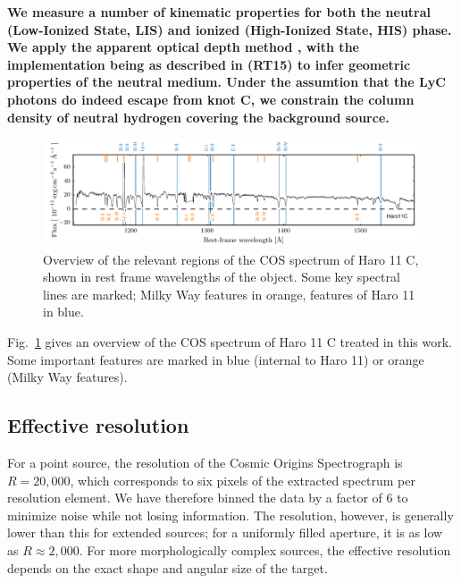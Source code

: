 \documentclass[twocolumn, trackchanges]{aastex61}
\begin{document}
\textbf{We measure a number of kinematic properties for both the neutral 
(Low-Ionized State, LIS) and ionized (High-Ionized State, HIS) phase. We apply 
the apparent optical depth method \citep[AOD, ][]{Savage1991, Pettini2002, Quider2009, Jones2013},
with the implementation being as described in \citet{RiveraThorsen2015} (RT15)
to infer geometric properties of the neutral medium. Under the assumtion that
the LyC photons do indeed escape from knot C, we constrain the 
column density of neutral hydrogen covering the background source.  
}

\begin{figure}
\centering
\includegraphics[]{../Figs/FullSpec.pdf}
\caption{Overview of the relevant regions of the COS spectrum of Haro 11
C, shown in rest frame wavelengths of the object. Some key spectral
lines are marked; Milky Way features in orange, features of Haro 11 in
blue.}\label{fig:fullspec}
\end{figure}

Fig.~\ref{fig:fullspec} gives an overview of the COS spectrum of Haro 11
C treated in this work. Some important features are marked in blue
(internal to Haro 11) or orange (Milky Way features).


\subsection{Effective resolution}\label{effective-resolution}

For a point source, the resolution of the Cosmic Origins Spectrograph is
$R=20,000$, which corresponds to six pixels of the extracted spectrum
per resolution element. We have therefore binned the data by a factor of
6 to minimize noise while not losing information. The resolution,
however, is generally lower than this for extended sources; for a
uniformly filled aperture, it is as low as $R\approx2,000$. For more
morphologically complex sources, the effective resolution depends on the
exact shape and angular size of the target.
\end{document}
